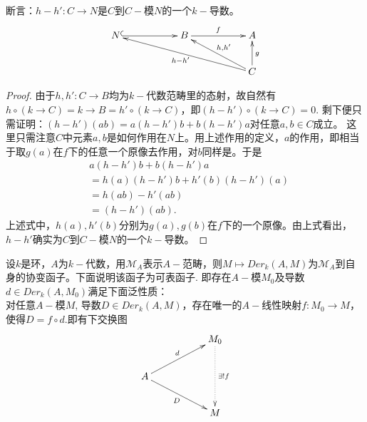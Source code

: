 \documentclass[UTF8]{article}
\begin{document}
断言：$h-h':C\rightarrow N$是$C$到$C-$模$N$的一个$k-$导数。
$$
\xymatrix{
N\ar@{^{(}->}[rr]& &B\ar[rr]^{f}&&A\\
& &&&C\ar[ullll]^{h-h'}\ar[ull]_{h,h'}\ar[u]_{g}
}
$$
\begin{proof}
由于$h,h':C\rightarrow B$均为$k-$代数范畴里的态射，故自然有$h\circ (k\rightarrow C)=k\rightarrow B=h'\circ (k\rightarrow C)$，即$(h-h')\circ (k\rightarrow C)=0.$
剩下便只需证明：$(h-h')(ab)=a(h-h')b+b(h-h')a$对任意$a,b\in C$成立。
这里只需注意$C$中元素$a,b$是如何作用在$N$上。用上述作用的定义，$a$的作用，即相当于取$g(a)$在$f$下的任意一个原像去作用，对$b$同样是。于是
\[
\begin{split}
&a(h-h')b+b(h-h')a\\
&=h(a)(h-h')b+h'(b)(h-h')(a)\\
&=h(ab)-h'(ab)\\
&=(h-h')(ab).
\end{split}
\]
上述式中，$h(a),h'(b)$分别为$g(a),g(b)$在$f$下的一个原像。由上式看出，$h-h'$确实为$C$到$C-$模$N$的一个$k-$导数。
\end{proof}
设$k$是环，$A$为$k-$代数，用$\mathscr{M}_{A}$表示$A-$范畴，则$M\mapsto Der_{k}(A,M)$为$\mathscr{M}_{A}$到自身的协变函子。下面说明该函子为可表函子.
即存在$A-$模$M_{0}$及导数$d\in Der_{k}(A,M_{0})$满足下面泛性质：\\
对任意$A-$模$M$,
导数$D\in Der_{k}(A,M)$，存在唯一的$A-$线性映射$f:M_{0}\rightarrow M$，使得$D=f\circ d$.即有下交换图
$$
\xymatrix{
& &M_{0}\ar@{.>}[dd]^{\exists !f}\\
A\ar[rru]^{d}\ar[rrd]_{D}& &\\
&&M
}
$$
\end{document}
